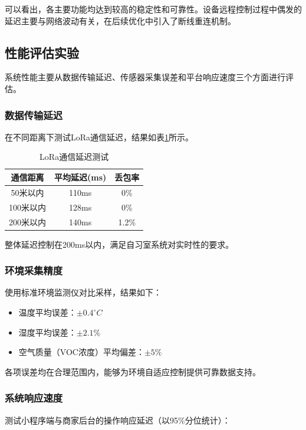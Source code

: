 \documentclass[12pt,a4paper]{IEEEtran} %
\begin{document}
可以看出，各主要功能均达到较高的稳定性和可靠性。设备远程控制过程中偶发的延迟主要与网络波动有关，在后续优化中引入了断线重连机制。

\subsection{性能评估实验}
系统性能主要从数据传输延迟、传感器采集误差和平台响应速度三个方面进行评估。

\subsubsection{数据传输延迟}
在不同距离下测试LoRa通信延迟，结果如表\ref{tab:delay}所示。

\begin{table}[H]
  \centering
  \caption{LoRa通信延迟测试}
  \label{tab:delay}
  \begin{tabular}{|c|c|c|}
    \hline
    \textbf{通信距离} & \textbf{平均延迟(ms)} & \textbf{丢包率} \\ \hline
    50米以内         & 110ms             & 0\%          \\ \hline
    100米以内        & 128ms             & 0\%          \\ \hline
    200米以内        & 140ms             & 1.2\%        \\ \hline
  \end{tabular}
\end{table}

整体延迟控制在200ms以内，满足自习室系统对实时性的要求。

\subsubsection{环境采集精度}
使用标准环境监测仪对比采样，结果如下：

\begin{itemize}
  \item 温度平均误差：$\pm 0.4^\circ C$
  \item 湿度平均误差：$\pm 2.1\%$
  \item 空气质量（VOC浓度）平均偏差：$\pm 5\%$
\end{itemize}

各项误差均在合理范围内，能够为环境自适应控制提供可靠数据支持。

\subsubsection{系统响应速度}
测试小程序端与商家后台的操作响应延迟（以95\%分位统计）：
\end{document}
